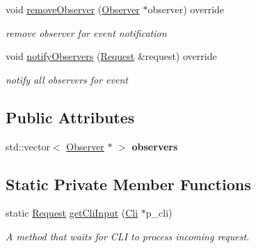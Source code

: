 \begin{DoxyCompactItemize}
void \hyperlink{classClient_abfce703b679961b961ff24bbfc532ce4}{remove\+Observer} (\hyperlink{classObserver}{Observer} $\ast$observer) override
\begin{DoxyCompactList}\small\item\em remove observer for event notification \end{DoxyCompactList}\item 
void \hyperlink{classClient_a2fb08fe51afa68997faa22474e114771}{notify\+Observers} (\hyperlink{classRequest}{Request} \&request) override
\begin{DoxyCompactList}\small\item\em notify all observers for event \end{DoxyCompactList}\end{DoxyCompactItemize}
\subsection*{Public Attributes}
\begin{DoxyCompactItemize}
\item 
\mbox{\label{classClient_aa15a286318864b5c004197ec682f5230}} 
std\+::vector$<$ \hyperlink{classObserver}{Observer} $\ast$ $>$ {\bfseries observers}
\end{DoxyCompactItemize}
\subsection*{Static Private Member Functions}
\begin{DoxyCompactItemize}
\item 
static \hyperlink{classRequest}{Request} \hyperlink{classClient_abd9bf3421bbc1e0ad11685cc95af53a8}{get\+Cli\+Input} (\hyperlink{classCli}{Cli} $\ast$p\+\_\+cli)
\begin{DoxyCompactList}\small\item\em A method that waits for C\+LI to process incoming request. \end{DoxyCompactList}\end{DoxyCompactItemize}
